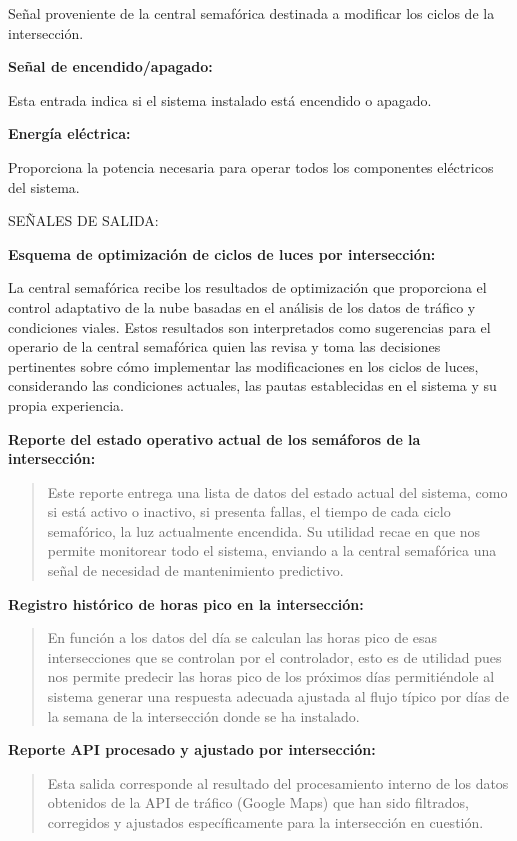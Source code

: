 \documentclass[12pt,a4paper,oneside]{report}
\begin{document}
Señal proveniente de la central semafórica destinada a modificar los ciclos de la intersección.

\textbf{Señal de encendido/apagado:}

Esta entrada indica si el sistema instalado está encendido o apagado.

\textbf{Energía eléctrica:}

Proporciona la potencia necesaria para operar todos los componentes eléctricos del sistema.

SEÑALES DE SALIDA:

\textbf{Esquema de optimización de ciclos de luces por intersección:}

La central semafórica recibe los resultados de optimización que proporciona el control adaptativo de la nube basadas en el análisis de los datos de tráfico y condiciones viales. Estos resultados son interpretados como sugerencias para el operario de la central semafórica quien las revisa y toma las decisiones pertinentes sobre cómo implementar las modificaciones en los ciclos de luces, considerando las condiciones actuales, las pautas establecidas en el sistema y su propia experiencia.

\textbf{Reporte del estado operativo actual de los semáforos de la intersección:}

\begin{quote}
Este reporte entrega una lista de datos del estado actual del sistema, como si está activo o inactivo, si presenta fallas, el tiempo de cada ciclo semafórico, la luz actualmente encendida. Su utilidad recae en que nos permite monitorear todo el sistema, enviando a la central semafórica una señal de necesidad de mantenimiento predictivo.
\end{quote}

\textbf{Registro histórico de horas pico en la intersección:}

\begin{quote}
En función a los datos del día se calculan las horas pico de esas intersecciones que se controlan por el controlador, esto es de utilidad pues nos permite predecir las horas pico de los próximos días permitiéndole al sistema generar una respuesta adecuada ajustada al flujo típico por días de la semana de la intersección donde se ha instalado.
\end{quote}

\textbf{Reporte API procesado y ajustado por intersección:}

\begin{quote}
Esta salida corresponde al resultado del procesamiento interno de los datos obtenidos de la API de tráfico (Google Maps) que han sido filtrados, corregidos y ajustados específicamente para la intersección en cuestión.
\end{quote}
\end{document}
